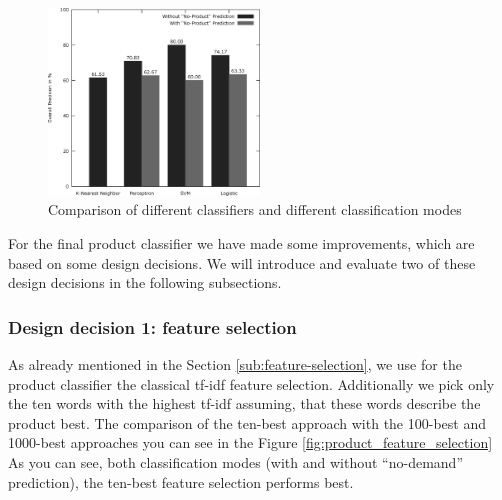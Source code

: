 \begin{figure}
	\begin{center}
		\includegraphics[width=0.5\textwidth]{figures/product_eval.eps}
	\end{center}
	\caption{Comparison of different classifiers and different classification modes}
	\label{fig:product_eval}
\end{figure}

For the final product classifier we have made some improvements, which are based on some design decisions.
We will introduce and evaluate two of these design decisions in the following subsections.

\subsubsection{Design decision 1: feature selection}
As already mentioned in the Section \ref{sub:feature-selection}, we use for the product classifier the classical tf-idf feature selection.
Additionally we pick only the ten words with the highest tf-idf assuming, that these words describe the product best.
The comparison of the ten-best approach with the 100-best and 1000-best approaches you can see in the Figure \ref{fig:product_feature_selection}
As you can see, both classification modes (with and without ``no-demand'' prediction), the ten-best feature selection performs best.

